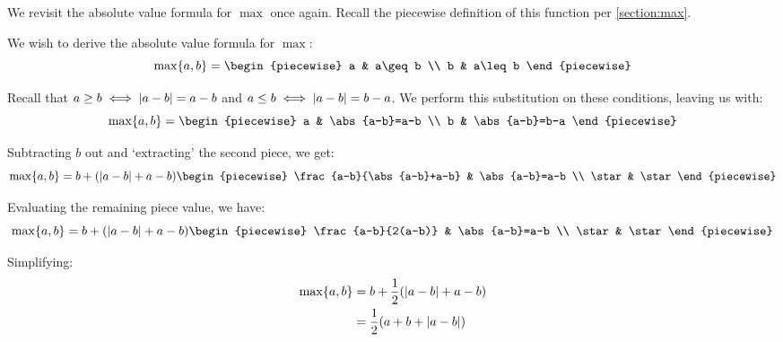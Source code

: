 \begin{example}
    \label{example:max_further}
    We revisit the absolute value formula for $\max$ once again. Recall the piecewise definition of this function per \ref{section:max}.

    We wish to derive the absolute value formula for $\max$:
    $$
        \max\br{a,b}=\begin{piecewise}
            a & a\geq b \\
            b & a\leq b
        \end{piecewise}
    $$

    Recall that $a\geq b\iff \abs{a-b}=a-b$ and $a\leq b\iff \abs{a-b}=b-a$. We perform this substitution on these conditions, leaving us with:
    $$
        \max\br{a,b}=\begin{piecewise}
            a & \abs{a-b}=a-b \\
            b & \abs{a-b}=b-a
        \end{piecewise}
    $$

    Subtracting $b$ out and `extracting' the second piece, we get:
    $$
        \max\br{a,b}=b+\paren*{\abs{a-b}+a-b}\begin{piecewise}
            \frac{a-b}{\abs{a-b}+a-b} & \abs{a-b}=a-b \\
            \star & \star
        \end{piecewise}
    $$

    Evaluating the remaining piece value, we have:
    $$
        \max\br{a,b}=b+\paren*{\abs{a-b}+a-b}\begin{piecewise}
            \frac{a-b}{2(a-b)} & \abs{a-b}=a-b \\
            \star & \star
        \end{piecewise}
    $$

    Simplifying:
    \begin{align*}
        \max\br{a,b} &= b+\frac{1}{2}\paren*{\abs{a-b}+a-b} \\
        &= \frac{1}{2}\paren*{a+b+\abs{a-b}}
    \end{align*}
\end{example}

